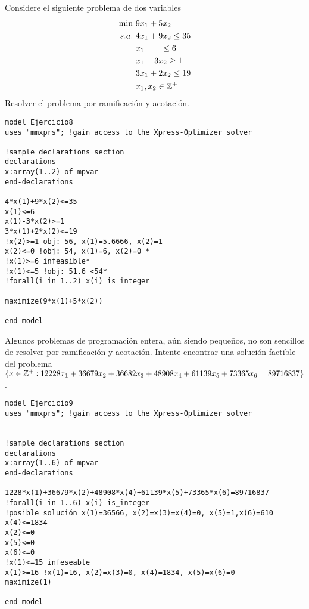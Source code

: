 \documentclass[twoside]{article}
\begin{document}
\newpage

\begin{ejercicio}{8}
Considere el siguiente problema de dos variables
\begin{align*}
\min\ & 9x_1+5x_2\\
s.a.\   & 4x_1+9x_2\leq 35\\
       & x_1\qquad\leq 6\\
       & x_1-3x_2\geq 1\\
       & 3x_1+2x_2\leq 19\\
       & x_1,x_2\in\mathbb{Z}^+
\end{align*}
Resolver el problema por ramificación y acotación.
\end{ejercicio}
\begin{solucion}
\begin{verbatim}
model Ejercicio8
uses "mmxprs"; !gain access to the Xpress-Optimizer solver

!sample declarations section
declarations
x:array(1..2) of mpvar
end-declarations

4*x(1)+9*x(2)<=35
x(1)<=6
x(1)-3*x(2)>=1
3*x(1)+2*x(2)<=19
!x(2)>=1 obj: 56, x(1)=5.6666, x(2)=1
x(2)<=0 !obj: 54, x(1)=6, x(2)=0 *
!x(1)>=6 infeasible*
!x(1)<=5 !obj: 51.6 <54*
!forall(i in 1..2) x(i) is_integer

maximize(9*x(1)+5*x(2))

end-model
\end{verbatim}
\end{solucion}

\newpage

\begin{ejercicio}{9}
Algunos problemas de programación entera, aún siendo pequeños, no son sencillos de resolver por ramificación y acotación. Intente encontrar una solución factible del problema $\{x\in\mathbb{Z}^+: 12228x_1+36679x_2+36682x_3+48908x_4+61139x_5+73365x_6=89716837\}$.
\end{ejercicio}
\begin{solucion}
\begin{verbatim}
model Ejercicio9
uses "mmxprs"; !gain access to the Xpress-Optimizer solver


!sample declarations section
declarations
x:array(1..6) of mpvar
end-declarations

1228*x(1)+36679*x(2)+48908*x(4)+61139*x(5)+73365*x(6)=89716837
!forall(i in 1..6) x(i) is_integer
!posible solución x(1)=36566, x(2)=x(3)=x(4)=0, x(5)=1,x(6)=610
x(4)<=1834
x(2)<=0
x(5)<=0
x(6)<=0
!x(1)<=15 infeseable
x(1)>=16 !x(1)=16, x(2)=x(3)=0, x(4)=1834, x(5)=x(6)=0
maximize(1)

end-model
\end{verbatim}
\end{solucion}
\end{document}
